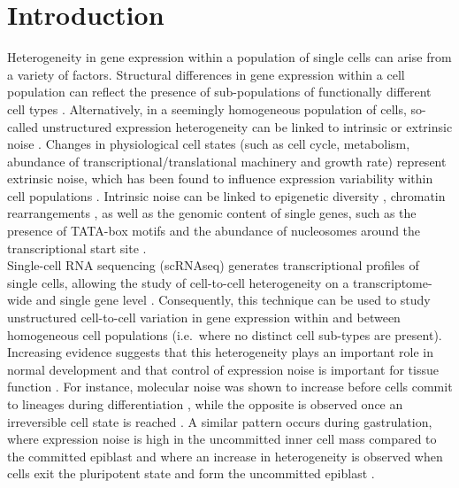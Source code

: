 
\section{Introduction}


Heterogeneity in gene expression within a population of single cells can arise from a variety of factors. Structural differences in gene expression within a cell population can reflect the presence of sub-populations of functionally different cell types \citep{Zeisel2015, Paul2015}. Alternatively, in a seemingly homogeneous population of cells, so-called unstructured expression heterogeneity can be linked to intrinsic or extrinsic noise \citep{Elowitz2002}. 
Changes in physiological cell states (such as cell cycle, metabolism, abundance of transcriptional/translational machinery and growth rate) represent extrinsic noise, which has been found to influence expression variability within cell populations \citep{Keren2015, Buettner2015, Zeng2017}. Intrinsic noise can be linked to epigenetic diversity \citep{Smallwood2014}, chromatin rearrangements \citep{Buenrostro2015}, as well as the genomic content of single genes, such as the presence of TATA-box motifs and the abundance of nucleosomes around the transcriptional start site \citep{Hornung2012}.  \\ 

Single-cell RNA sequencing (scRNAseq) generates transcriptional profiles of single cells, allowing the study of cell-to-cell heterogeneity on a transcriptome-wide \citep{Grun2014} and single gene level \citep{Goolam2016}. Consequently, this technique can be used to study unstructured cell-to-cell variation in gene expression within and between homogeneous cell populations (i.e.~where no distinct cell sub-types are present). Increasing evidence suggests that this heterogeneity plays an important role in normal development \citep{Chang2008} and that control of expression noise is important for tissue function \citep{BaharHalpern2015}. For instance, molecular noise was shown to increase before cells commit to lineages during differentiation \citep{Mojtahedi2016}, while the opposite is observed once an irreversible cell state is reached \citep{Richard2016}. A similar pattern occurs 
during gastrulation, where expression noise is high in the uncommitted inner cell mass compared to the committed epiblast and where an increase in heterogeneity is observed when cells exit the pluripotent state and form the uncommitted epiblast \citep{Mohammed2017}. \\

